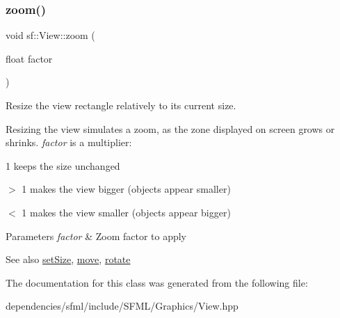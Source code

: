 \subsubsection{\texorpdfstring{zoom()}{zoom()}}
{\footnotesize\ttfamily void sf\+::\+View\+::zoom (\begin{DoxyParamCaption}\item[{float}]{factor }\end{DoxyParamCaption})}



Resize the view rectangle relatively to its current size. 

Resizing the view simulates a zoom, as the zone displayed on screen grows or shrinks. {\itshape factor} is a multiplier\+: \begin{DoxyItemize}
\item 1 keeps the size unchanged \item $>$ 1 makes the view bigger (objects appear smaller) \item $<$ 1 makes the view smaller (objects appear bigger)\end{DoxyItemize}

\begin{DoxyParams}{Parameters}
{\em factor} & Zoom factor to apply\\
\hline
\end{DoxyParams}
\begin{DoxySeeAlso}{See also}
\hyperlink{classsf_1_1_view_a9525b73fe9fbaceb9568faf56b399dab}{set\+Size}, \hyperlink{classsf_1_1_view_a0c82144b837caf812f7cb25a43d80c41}{move}, \hyperlink{classsf_1_1_view_a5fd3901aae1845586ca40add94faa378}{rotate} 
\end{DoxySeeAlso}


The documentation for this class was generated from the following file\+:\begin{DoxyCompactItemize}
\item 
dependencies/sfml/include/\+S\+F\+M\+L/\+Graphics/View.\+hpp\end{DoxyCompactItemize}
